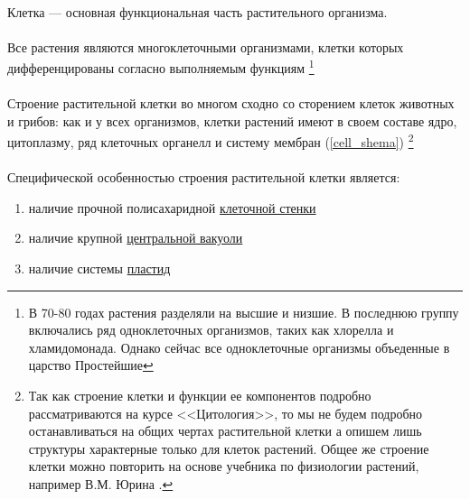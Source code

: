 \paragraph*{}

\paragraph*{}Клетка — основная функциональная часть растительного организма. 

\paragraph*{}Все растения являются многоклеточными организмами, клетки которых дифференцированы согласно выполняемым функциям \footnote{В 70-80 годах растения разделяли на высшие и низшие. В последнюю группу включались ряд одноклеточных организмов, таких как хлорелла и хламидомонада. Однако сейчас все одноклеточные организмы объеденные в царство Простейшие}

\paragraph*{}Строение растительной клетки во многом сходно со сторением клеток животных и грибов: как и у всех \hyperlink{q_prok_cell}{} организмов, клетки растений имеют в своем составе ядро, цитоплазму, ряд клеточных органелл и систему мембран (\ris \ref{cell_shema}) \footnote{Так как строение клетки и функции ее компонентов подробно рассматриваются на курсе <<Цитология>>, то мы не будем подробно останавливаться на общих чертах растительной клетки а опишем лишь структуры характерные только для клеток растений. Общее же строение клетки можно повторить на основе учебника по физиологии растений, например В.М. Юрина \cite{urin_2010}.}

\paragraph*{}Специфической особенностью строения растительной клетки является:

\begin{enumerate}
    \item наличие прочной полисахаридной \hyperlink{cell_wall}{клеточной стенки}
    \item наличие крупной \hyperlink{cell_vakuol}{центральной вакуоли}
	\item наличие системы \hyperlink{cell_plastids}{пластид}
	
\end{enumerate}

